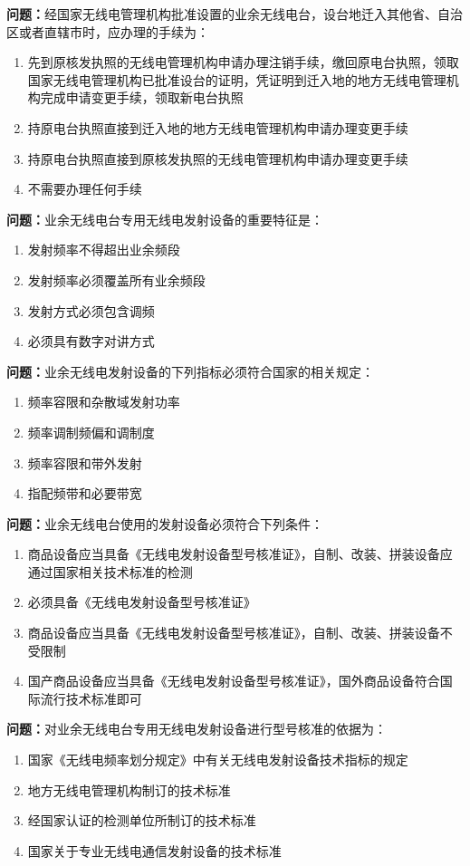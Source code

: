 \textbf{问题：}经国家无线电管理机构批准设置的业余无线电台，设台地迁入其他省、自治区或者直辖市时，应办理的手续为：
\begin{enumerate}[label=\Alph*), leftmargin=3em]
	\item 先到原核发执照的无线电管理机构申请办理注销手续，缴回原电台执照，领取国家无线电管理机构已批准设台的证明，凭证明到迁入地的地方无线电管理机构完成申请变更手续，领取新电台执照
	\item 持原电台执照直接到迁入地的地方无线电管理机构申请办理变更手续
	\item 持原电台执照直接到原核发执照的无线电管理机构申请办理变更手续
	\item 不需要办理任何手续
\end{enumerate}

\textbf{问题：}业余无线电台专用无线电发射设备的重要特征是：
\begin{enumerate}[label=\Alph*), leftmargin=3em]
	\item 发射频率不得超出业余频段
	\item 发射频率必须覆盖所有业余频段
	\item 发射方式必须包含调频
	\item 必须具有数字对讲方式
\end{enumerate}

\textbf{问题：}业余无线电发射设备的下列指标必须符合国家的相关规定：
\begin{enumerate}[label=\Alph*), leftmargin=3em]
	\item 频率容限和杂散域发射功率
	\item 频率调制频偏和调制度
	\item 频率容限和带外发射
	\item 指配频带和必要带宽
\end{enumerate}

\textbf{问题：}业余无线电台使用的发射设备必须符合下列条件：
\begin{enumerate}[label=\Alph*), leftmargin=3em]
	\item 商品设备应当具备《无线电发射设备型号核准证》，自制、改装、拼装设备应通过国家相关技术标准的检测
	\item 必须具备《无线电发射设备型号核准证》
	\item 商品设备应当具备《无线电发射设备型号核准证》，自制、改装、拼装设备不受限制
	\item 国产商品设备应当具备《无线电发射设备型号核准证》，国外商品设备符合国际流行技术标准即可
\end{enumerate}

\textbf{问题：}对业余无线电台专用无线电发射设备进行型号核准的依据为：
\begin{enumerate}[label=\Alph*), leftmargin=3em]
	\item 国家《无线电频率划分规定》中有关无线电发射设备技术指标的规定
	\item 地方无线电管理机构制订的技术标准
	\item 经国家认证的检测单位所制订的技术标准
	\item 国家关于专业无线电通信发射设备的技术标准
\end{enumerate}

